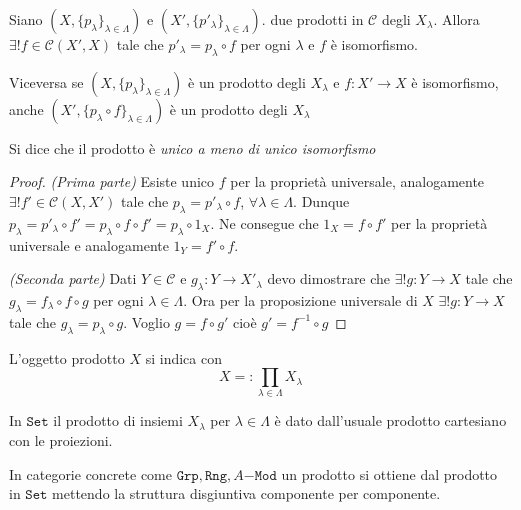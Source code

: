 \begin{proposition}{}
    Siano \({(X, \{p_\lambda\}_{\lambda \in \Lambda} )}\) e \({(X', \{p'_{\lambda} \}_{\lambda \in \Lambda} )}\).
    due prodotti in \(\mathcal{C}\) degli \(X_{\lambda} \). Allora \(\exists ! f \in \mathcal{\mathcal{C}}{(X', X)}\) 
    tale che \(p'_\lambda = p_\lambda \circ f\) per ogni \(\lambda\) e \(f\) è
    isomorfismo. 

    Viceversa se \({(X, \{p_\lambda\}_{\lambda \in \Lambda} )}\) è un prodotto
    degli \(X_\lambda\) e \(f : X' \to X\) è isomorfismo, anche \({(X', \{p_\lambda \circ f\}_{\lambda \in \Lambda} )}\) è un prodotto degli \(X_\lambda\) 
\end{proposition}
\begin{remark}{}
    Si dice che il prodotto è \emph{unico a meno di unico isomorfismo}
\end{remark}
\begin{proof}
    \emph{(Prima parte)}
    Esiste unico \(f\) per la proprietà universale, analogamente \(\exists ! f'
    \in \mathcal{\mathcal{C}}{(X, X')}\) tale che \(p_\lambda = p'_\lambda \circ f\), \(\forall \lambda \in \Lambda\). Dunque \(p_\lambda = p'_\lambda \circ f' = p_\lambda \circ f \circ f' = p_\lambda
     \circ 1_X\). Ne consegue che \(1_X = f \circ f'\) per la proprietà
     universale e analogamente \(1_Y = f'\circ f\).

     \emph{(Seconda parte)} Dati \(Y \in \mathcal{\mathcal{C}}\) e \(g_\lambda : Y \to
     X'_\lambda\) devo dimostrare che \(\exists ! g : Y \to X\) tale che \(
     g_\lambda = f_\lambda \circ f \circ g\) per ogni \(\lambda \in \Lambda\).
     Ora per la proposizione universale di \(X\) \(\exists ! g : Y \to X\) tale
     che \(g_\lambda = p_\lambda \circ g\). Voglio \(g = f \circ g'\) cioè \(g'
     = f^{-1} \circ g\) 
\end{proof}

\begin{note}[zione]
    L'oggetto prodotto \(X\) si indica con
    \[
      X =: \prod_{\lambda \in \Lambda} X_\lambda
    \]
\end{note}

\begin{example}{}
    In \(\mathtt{Set}\) il prodotto di insiemi \(X_\lambda\) per \(\lambda \in \Lambda\) 
    è dato dall'usuale prodotto cartesiano con le proiezioni.

    In categorie concrete come \(\mathtt{Grp}, \mathtt{Rng}, A\mathtt{-Mod}\) un
    prodotto si ottiene dal prodotto in \(\mathtt{Set}\) mettendo la struttura
    disgiuntiva componente per componente.
\end{example}

